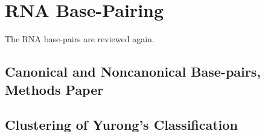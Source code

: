 \chapter{RNA Base-Pairing}
\label{basepairs} 

The RNA base-pairs are reviewed again.
\section{Canonical and Noncanonical Base-pairs, Methods Paper}




\section{Clustering of Yurong's Classification}



